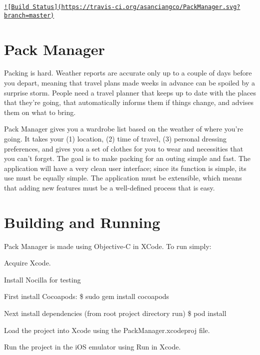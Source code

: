 \href{https://travis-ci.org/asanciangco/PackManager}{\tt !\mbox{[}Build Status\mbox{]}(https\-://travis-\/ci.\-org/asanciangco/\-Pack\-Manager.\-svg?branch=master)}

\section*{Pack Manager}

Packing is hard. Weather reports are accurate only up to a couple of days before you depart, meaning that travel plans made weeks in advance can be spoiled by a surprise storm. People need a travel planner that keeps up to date with the places that they're going, that automatically informs them if things change, and advises them on what to bring.

Pack Manager gives you a wardrobe list based on the weather of where you're going. It takes your (1) location, (2) time of travel, (3) personal dressing preferences, and gives you a set of clothes for you to wear and necessities that you can't forget. The goal is to make packing for an outing simple and fast. The application will have a very clean user interface; since its function is simple, its use must be equally simple. The application must be extensible, which means that adding new features must be a well-\/defined process that is easy.

\section*{Building and Running}

Pack Manager is made using Objective-\/\-C in X\-Code. To run simply\-:


\begin{DoxyItemize}
\item Acquire Xcode.
\item Install Nocilla for testing
\begin{DoxyItemize}
\item First install Cocoapods\-: {\ttfamily \$ sudo gem install cocoapods}
\item Next install dependencies (from root project directory run) {\ttfamily \$ pod install}
\end{DoxyItemize}
\item Load the project into Xcode using the {\ttfamily Pack\-Manager.\-xcodeproj} file.
\item Run the project in the i\-O\-S emulator using {\ttfamily Run} in Xcode. 
\end{DoxyItemize}